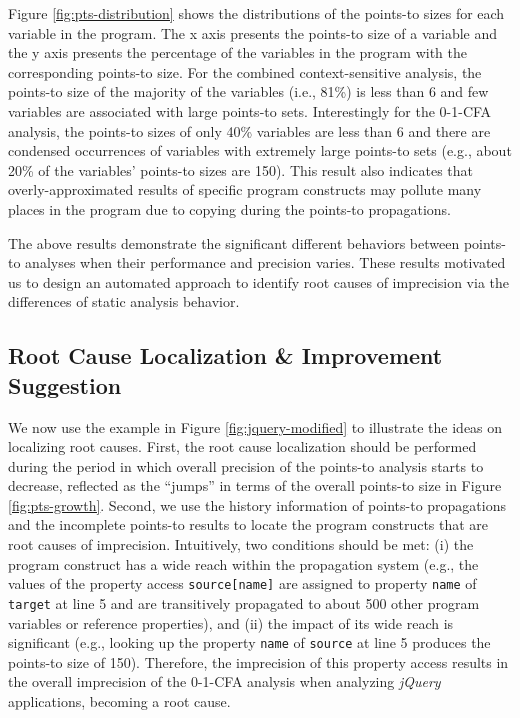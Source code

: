 Figure \ref{fig:pts-distribution} shows the distributions of the points-to sizes for each variable in the program. The x axis presents the points-to size of a variable and the y axis presents the percentage of the variables in the program with the corresponding points-to size. For the combined context-sensitive analysis, the points-to size of the majority of the variables (i.e., 81\%) is less than 6 and few variables are associated with large points-to sets. Interestingly for the 0-1-CFA analysis, the points-to sizes of only 40\% variables are less than 6 and there are condensed occurrences of variables with extremely large points-to sets (e.g., about 20\% of the variables' points-to sizes are 150). This result also indicates that overly-approximated results of specific program constructs may pollute many places in the program due to copying during the points-to propagations.

The above results demonstrate the significant different behaviors between points-to analyses when their performance and precision varies. These results motivated us to design an automated approach to identify root causes of imprecision via the differences of static analysis behavior. 

\subsection{Root Cause Localization \& Improvement Suggestion}

We now use the example in Figure \ref{fig:jquery-modified} to illustrate the ideas on localizing root causes. First, the root cause localization should be performed during the period in which overall precision of the points-to analysis starts to decrease, reflected as the ``jumps'' in terms of the overall points-to size in Figure \ref{fig:pts-growth}. Second, we use the history information of points-to propagations and the incomplete points-to results to locate the program constructs that are root causes of imprecision. Intuitively, two conditions should be met: (i) the program construct has a wide reach within the propagation system (e.g., the values of the property access {\tt source[name]} are assigned to property {\tt name} of {\tt target} at line 5 and are transitively propagated to about 500 other program variables or reference properties), and (ii) the impact of its wide reach is significant (e.g., looking up the property {\tt name} of {\tt source} at line 5 produces the points-to size of 150). Therefore, the imprecision of this property access results in the overall imprecision of the 0-1-CFA analysis when analyzing {\it jQuery} applications, becoming a root cause.

